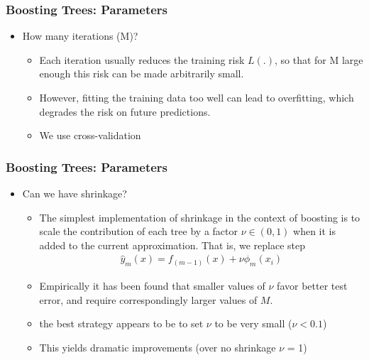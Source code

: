 \documentclass[
  shownotes,
  xcolor={svgnames},
  hyperref={colorlinks,citecolor=DarkBlue,linkcolor=DarkRed,urlcolor=DarkBlue}
  , aspectratio=169]{beamer}
\begin{document}
\begin{frame}[fragile]
\frametitle{Boosting Trees: Parameters}

\begin{itemize}

\item How many iterations (M)?
\begin{itemize}
\medskip

\item Each iteration usually reduces the training risk $L(.)$, so that for M large enough this risk can be made arbitrarily small.
\medskip
\item  However, fitting the training data too well can lead to overfitting, which degrades the risk on future predictions. 

\medskip
\item We use cross-validation
\end{itemize}
\end{itemize}
\end{frame}

\begin{frame}[fragile]
\frametitle{Boosting Trees: Parameters}
\begin{itemize}
\item Can we have shrinkage?
\begin{itemize}
  \item The simplest implementation of shrinkage in the context of boosting is to scale the contribution of each tree by a factor $\nu \in (0,1)$ when it is added to the current approximation. That is, we replace step 
  \begin{align}
   \hat{y}_m (x)=f_{(m-1)}(x) + \nu \phi_m(x_i)
  \end{align}
  \item Empirically it has been found  that smaller values of $\nu$ favor better test error, and require correspondingly larger values of $M$. 
  \item the best strategy appears to be to set $\nu$ to be very small ($\nu < 0.1$)
  \item This yields dramatic improvements (over no shrinkage $\nu$ = 1) 
\end{itemize} 

\end{itemize}

\end{frame}
\end{document}
